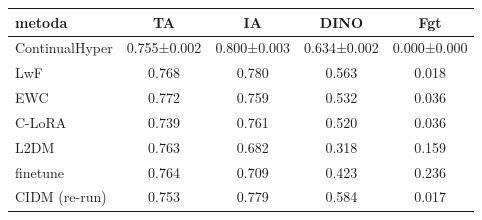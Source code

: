 \begin{tabular}{lcccc}
\toprule
metoda & TA & IA & DINO & Fgt \\
\midrule
ContinualHyper & 0.755±0.002 & 0.800±0.003 & 0.634±0.002 & 0.000±0.000 \\
LwF & 0.768 & 0.780 & 0.563 & 0.018 \\
EWC & 0.772 & 0.759 & 0.532 & 0.036 \\
C-LoRA & 0.739 & 0.761 & 0.520 & 0.036 \\
L2DM & 0.763 & 0.682 & 0.318 & 0.159 \\
finetune & 0.764 & 0.709 & 0.423 & 0.236 \\
CIDM (re-run) & 0.753 & 0.779 & 0.584 & 0.017 \\
\bottomrule
\end{tabular}
